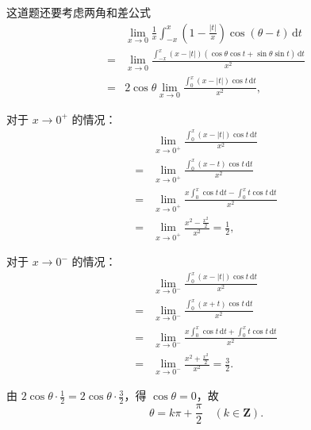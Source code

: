 \documentclass[12pt, a4paper, oneside, UTF8]{ctexbook}
\begin{document}
\begin{solution}
这道题还要考虑两角和差公式
\begin{align*}
& \lim_{x \to 0} \frac{1}{x} \int_{-x}^{x} \left(1 - \frac{|t|}{x}\right) \cos(\theta - t) \, \mathrm{d}t \\
= & \lim_{x \to 0} \frac{\int_{-x}^{x} (x - |t|)(\cos\theta \cos t + \sin\theta \sin t) \, \mathrm{d}t}{x^{2}} \\
= & 2\cos\theta \lim_{x \to 0} \frac{\int_{0}^{x} (x - |t|) \cos t \, \mathrm{d}t}{x^{2}},
\end{align*}

对于 $ x \to 0^{+} $ 的情况：
\begin{align*}
& \lim_{x \to 0^{+}} \frac{\int_{0}^{x} (x - |t|) \cos t \, \mathrm{d}t}{x^{2}} \\
= & \lim_{x \to 0^{+}} \frac{\int_{0}^{x} (x - t) \cos t \, \mathrm{d}t}{x^{2}} \\
= & \lim_{x \to 0^{+}} \frac{x \int_{0}^{x} \cos t \, \mathrm{d}t - \int_{0}^{x} t \cos t \, \mathrm{d}t}{x^{2}} \\
= & \lim_{x \to 0^{+}} \frac{x^{2} - \frac{x^{2}}{2}}{x^{2}} = \frac{1}{2},
\end{align*}

对于 $ x \to 0^{-} $ 的情况：
\begin{align*}
& \lim_{x \to 0^{-}} \frac{\int_{0}^{x} (x - |t|) \cos t \, \mathrm{d}t}{x^{2}} \\
= & \lim_{x \to 0^{-}} \frac{\int_{0}^{x} (x + t) \cos t \, \mathrm{d}t}{x^{2}} \\
= & \lim_{x \to 0^{-}} \frac{x \int_{0}^{x} \cos t \, \mathrm{d}t + \int_{0}^{x} t \cos t \, \mathrm{d}t}{x^{2}} \\
= & \lim_{x \to 0^{-}} \frac{x^{2} + \frac{x^{2}}{2}}{x^{2}} = \frac{3}{2}.
\end{align*}

由 $ 2\cos\theta \cdot \frac{1}{2} = 2\cos\theta \cdot \frac{3}{2} $，得 $ \cos\theta = 0 $，故
$$ \theta = k\pi + \frac{\pi}{2} \quad (k \in \mathbf{Z}). $$
\end{solution}
\end{document}
